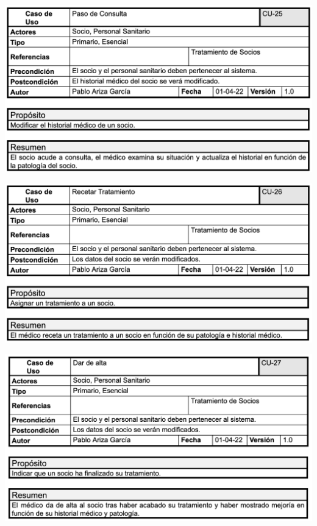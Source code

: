 \documentclass[12pt, spanish]{article}
\begin{document}
\begin{centering}\includegraphics[scale = 0.70]{casos_de_uso/25.png}\\[1.0 cm]\end{centering}
\begin{centering}\includegraphics[scale = 0.70]{casos_de_uso/26.png}\\[1.0 cm]\end{centering}
\begin{centering}\includegraphics[scale = 0.70]{casos_de_uso/27.png}\\[1.0 cm]\end{centering}
\end{document}

